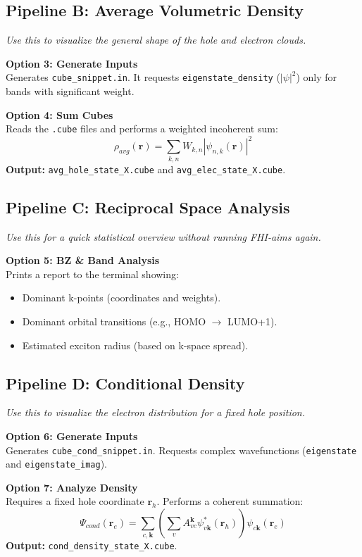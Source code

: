 \documentclass[a4paper,11pt]{article}
\begin{document}
\subsection{Pipeline B: Average Volumetric Density}
\textit{Use this to visualize the general shape of the hole and electron clouds.}

\textbf{Option 3: Generate Inputs} \\
Generates \texttt{cube\_snippet.in}. It requests \texttt{eigenstate\_density} ($|\psi|^2$) only for bands with significant weight.

\textbf{Option 4: Sum Cubes} \\
Reads the \texttt{.cube} files and performs a weighted incoherent sum:
\[ \rho_{avg}(\mathbf{r}) = \sum_{k,n} W_{k,n} |\psi_{n,k}(\mathbf{r})|^2 \]
\textbf{Output:} \texttt{avg\_hole\_state\_X.cube} and \texttt{avg\_elec\_state\_X.cube}.

\subsection{Pipeline C: Reciprocal Space Analysis}
\textit{Use this for a quick statistical overview without running FHI-aims again.}

\textbf{Option 5: BZ \& Band Analysis} \\
Prints a report to the terminal showing:
\begin{itemize}
    \item Dominant k-points (coordinates and weights).
    \item Dominant orbital transitions (e.g., HOMO $\to$ LUMO+1).
    \item Estimated exciton radius (based on k-space spread).
\end{itemize}

\subsection{Pipeline D: Conditional Density}
\textit{Use this to visualize the electron distribution for a fixed hole position.}

\textbf{Option 6: Generate Inputs} \\
Generates \texttt{cube\_cond\_snippet.in}. Requests complex wavefunctions (\texttt{eigenstate} and \texttt{eigenstate\_imag}).

\textbf{Option 7: Analyze Density} \\
Requires a fixed hole coordinate $\mathbf{r}_h$. Performs a coherent summation:
\[ \Psi_{cond}(\mathbf{r}_e) = \sum_{c, \mathbf{k}} \left( \sum_v A_{vc}^{\mathbf{k}} \psi_{v\mathbf{k}}^*(\mathbf{r}_h) \right) \psi_{c\mathbf{k}}(\mathbf{r}_e) \]
\textbf{Output:} \texttt{cond\_density\_state\_X.cube}.
\end{document}
